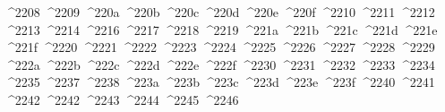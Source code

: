 {  ^^^^2208%
  ^^^^2209%
  ^^^^220a%
  ^^^^220b%
  ^^^^220c%
  ^^^^220d%
  ^^^^220e%
  ^^^^220f%
  ^^^^2210%
  ^^^^2211%
  ^^^^2212%
  ^^^^2213%
  ^^^^2214%
  ^^^^2216%
  ^^^^2217%
  ^^^^2218%
  ^^^^2219%
  ^^^^221a%
  ^^^^221b%
  ^^^^221c%
  ^^^^221d%
  ^^^^221e%
  ^^^^221f%
  ^^^^2220%
  ^^^^2221%
  ^^^^2222%
  ^^^^2223%
  ^^^^2224%
  ^^^^2225%
  ^^^^2226%
  ^^^^2227%
  ^^^^2228%
  ^^^^2229%
  ^^^^222a%
  ^^^^222b%
  ^^^^222c%
  ^^^^222d%
  ^^^^222e%
  ^^^^222f%
  ^^^^2230%
  ^^^^2231%
  ^^^^2232%
  ^^^^2233%
  ^^^^2234%
  ^^^^2235%
  ^^^^2237%
  ^^^^2238%
  ^^^^223a%
  ^^^^223b%
  ^^^^223c%
  ^^^^223d%
  ^^^^223e%
  ^^^^223f%
  ^^^^2240%
  ^^^^2241%
  ^^^^2242%
  ^^^^2242%
  ^^^^2243%
  ^^^^2244%
  ^^^^2245%
  ^^^^2246%
}
